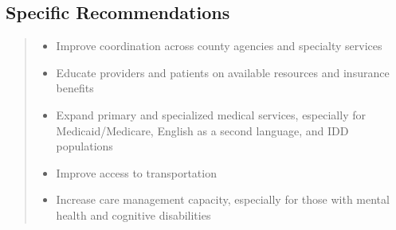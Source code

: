 \documentclass[
  english,
  letterpaper,
]{report}
\begin{document}
\subsection{Specific Recommendations}\label{specific-recommendations}

\begin{quote}
\begin{itemize}
\item
  Improve coordination across county agencies and specialty services
\item
  Educate providers and patients on available resources and insurance
  benefits
\item
  Expand primary and specialized medical services, especially for
  Medicaid/Medicare, English as a second language, and IDD populations
\item
  Improve access to transportation
\item
  Increase care management capacity, especially for those with mental
  health and cognitive disabilities
\end{itemize}
\end{quote}

\begin{figure}


\caption{\label{fig-dc-affect-health}}

\end{figure}%
\end{document}

